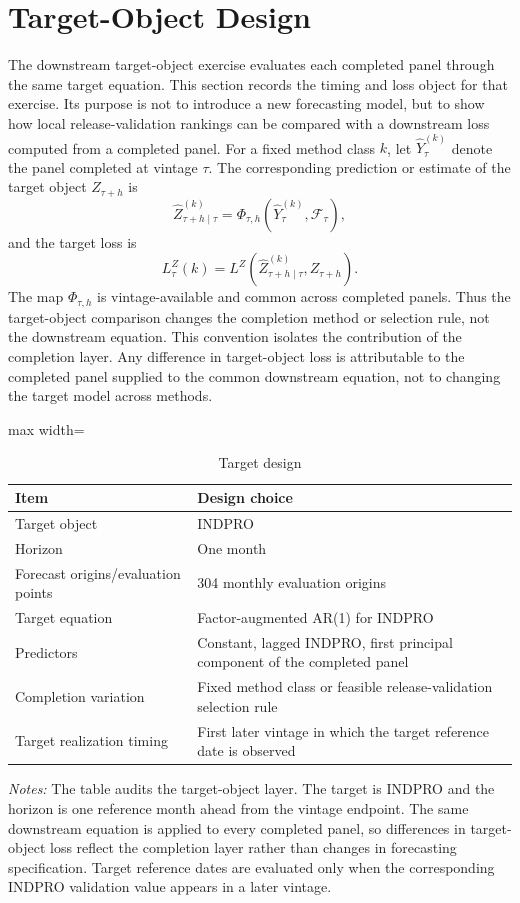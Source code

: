 \documentclass[a4paper,12pt]{article}
\newcommand{\Fcal}{\mathcal{F}}
\newcommand{\1}{\mathbf{1}}
\newcommand{\ExhibitNote}[1]{\begin{minipage}{0.94\textwidth}\footnotesize\emph{Notes:} #1\end{minipage}}
\begin{document}
\section{Target-Object Design}
\label{ia:target_object_design}

The downstream target-object exercise evaluates each completed panel through the same target equation. This section records the timing and loss object for that exercise. Its purpose is not to introduce a new forecasting model, but to show how local release-validation rankings can be compared with a downstream loss computed from a completed panel. For a fixed method class $k$, let $\widehat Y^{(k)}_\tau$ denote the panel completed at vintage $\tau$. The corresponding prediction or estimate of the target object $Z_{\tau+h}$ is
\[
\widehat Z^{(k)}_{\tau+h\mid\tau}=\Phi_{\tau,h}\!\left(\widehat Y^{(k)}_\tau,\Fcal_\tau\right),
\]
and the target loss is
\[
L^Z_\tau(k)=L^Z\!\left(\widehat Z^{(k)}_{\tau+h\mid\tau},Z_{\tau+h}\right).
\]
The map $\Phi_{\tau,h}$ is vintage-available and common across completed panels. Thus the target-object comparison changes the completion method or selection rule, not the downstream equation. This convention isolates the contribution of the completion layer. Any difference in target-object loss is attributable to the completed panel supplied to the common downstream equation, not to changing the target model across methods.

\begin{table}[H]
\centering
\caption{Target design}
\label{tab:ia_target_design}
\small
\begin{adjustbox}{max width=\textwidth}
\begin{tabular}{@{}ll@{}}
\toprule
Item & Design choice \\
\midrule
Target object & INDPRO \\
Horizon & One month \\
Forecast origins/evaluation points & 304 monthly evaluation origins \\
Target equation & Factor-augmented AR(1) for INDPRO \\
Predictors & Constant, lagged INDPRO, first principal component of the completed panel \\
Completion variation & Fixed method class or feasible release-validation selection rule \\
Target realization timing & First later vintage in which the target reference date is observed \\
\bottomrule
\end{tabular}
\end{adjustbox}
\par\medskip
\ExhibitNote{The table audits the target-object layer. The target is INDPRO and the horizon is one reference month ahead from the vintage endpoint. The same downstream equation is applied to every completed panel, so differences in target-object loss reflect the completion layer rather than changes in forecasting specification. Target reference dates are evaluated only when the corresponding INDPRO validation value appears in a later vintage.}
\end{table}
\end{document}
